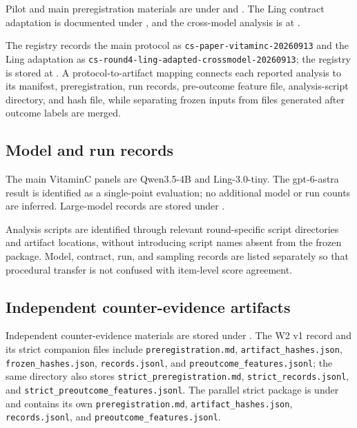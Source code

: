 \documentclass[11pt]{article}
\begin{document}
Pilot and main preregistration materials are under  and . The Ling contract adaptation is documented under , and the cross-model analysis is at .

The registry records the main protocol as \texttt{cs-paper-vitaminc-20260913} and the Ling adaptation as \texttt{cs-round4-ling-adapted-crossmodel-20260913}; the registry is stored at . A protocol-to-artifact mapping connects each reported analysis to its manifest, preregistration, run records, pre-outcome feature file, analysis-script directory, and hash file, while separating frozen inputs from files generated after outcome labels are merged.

\subsection{Model and run records}

The main VitaminC panels are Qwen3.5-4B and Ling-3.0-tiny. The gpt-6-astra result is identified as a single-point evaluation; no additional model or run counts are inferred. Large-model records are stored under .

Analysis scripts are identified through relevant round-specific script directories and artifact locations, without introducing script names absent from the frozen package. Model, contract, run, and sampling records are listed separately so that procedural transfer is not confused with item-level score agreement.

\subsection{Independent counter-evidence artifacts}

Independent counter-evidence materials are stored under . The W2 v1 record and its strict companion files include \texttt{preregistration.md}, \texttt{artifact\_hashes.json}, \texttt{frozen\_hashes.json}, \texttt{records.jsonl}, and \texttt{preoutcome\_features.jsonl}; the same directory also stores \texttt{strict\_preregistration.md}, \texttt{strict\_records.jsonl}, and \texttt{strict\_preoutcome\_features.jsonl}. The parallel strict package is under  and contains its own \texttt{preregistration.md}, \texttt{artifact\_hashes.json}, \texttt{records.jsonl}, and \texttt{preoutcome\_features.jsonl}.
\end{document}
